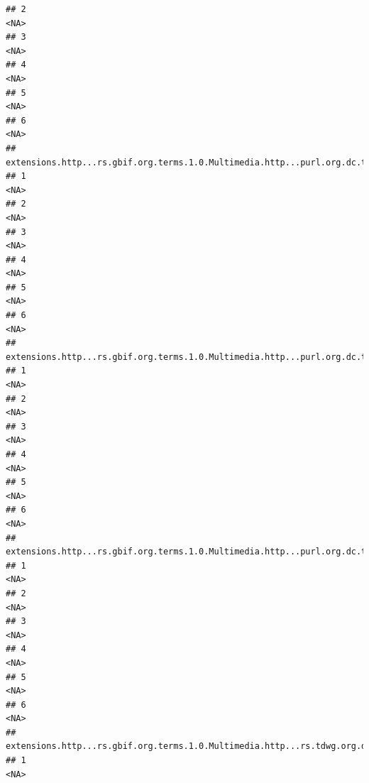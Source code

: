 \documentclass[
]{book}
\begin{document}
\begin{verbatim}
## 2                                                                                  <NA>
## 3                                                                                  <NA>
## 4                                                                                  <NA>
## 5                                                                                  <NA>
## 6                                                                                  <NA>
##   extensions.http...rs.gbif.org.terms.1.0.Multimedia.http...purl.org.dc.terms.rightsHolder.5
## 1                                                                                       <NA>
## 2                                                                                       <NA>
## 3                                                                                       <NA>
## 4                                                                                       <NA>
## 5                                                                                       <NA>
## 6                                                                                       <NA>
##   extensions.http...rs.gbif.org.terms.1.0.Multimedia.http...purl.org.dc.terms.identifier.5
## 1                                                                                     <NA>
## 2                                                                                     <NA>
## 3                                                                                     <NA>
## 4                                                                                     <NA>
## 5                                                                                     <NA>
## 6                                                                                     <NA>
##   extensions.http...rs.gbif.org.terms.1.0.Multimedia.http...purl.org.dc.terms.type.5
## 1                                                                               <NA>
## 2                                                                               <NA>
## 3                                                                               <NA>
## 4                                                                               <NA>
## 5                                                                               <NA>
## 6                                                                               <NA>
##   extensions.http...rs.gbif.org.terms.1.0.Multimedia.http...rs.tdwg.org.dwc.terms.catalogNumber.5
## 1                                                                                            <NA>

\end{verbatim}
\end{document}
